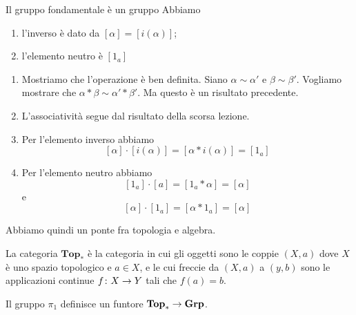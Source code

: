 \documentclass[a4paper]{article}
\begin{document}
\begin{snippetproposition}{Il gruppo fondamentale è un gruppo}
    Abbiamo
    \begin{enumerate}
        \item l'inverso è dato da \([\alpha] = [i(\alpha)]\);
        \item l'elemento neutro è \([1_a]\)
    \end{enumerate}
\end{snippetproposition}

\begin{snippetproof}{}
    \begin{enumerate}
        \item Mostriamo che l'operazione è ben definita.
        Siano \(\alpha \sim \alpha'\) e \(\beta \sim \beta'\).
        Vogliamo mostrare che \(\alpha \ast \beta \sim \alpha' \ast \beta'\).
        Ma questo è un risultato precedente.
        \item L'associatività segue dal risultato della scorsa lezione.
        \item Per l'elemento inverso abbiamo \[
            [\alpha] \cdot [i(\alpha)] = [\alpha \ast i(\alpha)]
            = [1_a]
        \]
        \item Per l'elemento neutro abbiamo
        \[
            [1_a] \cdot [a] = [1_a \ast \alpha] = [\alpha]
        \]
        e
        \[
            [\alpha] \cdot [1_a] = [\alpha \ast 1_a] = [\alpha]
        \]
    \end{enumerate}
\end{snippetproof}

Abbiamo quindi un ponte fra topologia e algebra.

\begin{snippetdefinition}{}
    La categoria \(\mathbf{Top}_\ast\) è la categoria in cui gli oggetti sono le coppie
    \((X, a)\) dove \(X\) è uno spazio topologico e \(a \in X\),
    e le cui freccie da \((X, a)\) a \((y, b)\) sono le applicazioni
    continue \(f \colon X \to Y\) tali che \(f(a)= b\).
\end{snippetdefinition}

\begin{snippetproposition}{}
    Il gruppo \(\pi_1\) definisce un funtore
    \(\mathbf{Top}_\ast \to \mathbf{Grp}\).
\end{snippetproposition}
\end{document}
